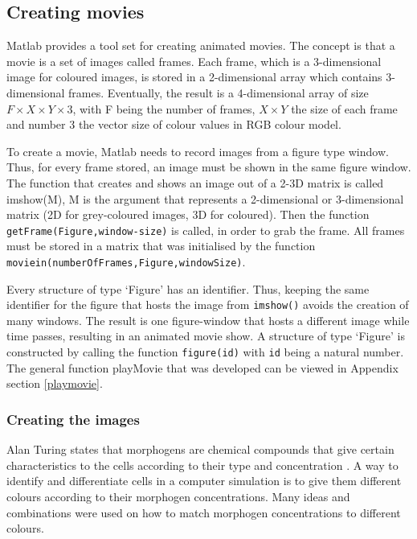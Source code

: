 	\subsection{Creating movies}
    Matlab provides a tool set for creating animated movies. The concept is that a movie is a set of images called frames. Each frame, which is a 3-dimensional image for coloured images, is stored in a 2-dimensional array which contains 3-dimensional frames. Eventually, the result is a 4-dimensional array of size $ F\times X\times Y\times 3 $, with F being the number of frames, $ X\times Y $ the size of each frame and number 3 the vector size of colour values in RGB colour model. 
    
To create a movie, Matlab needs to record images from a figure type window. Thus, for every frame stored, an image must be shown in the same figure window. The function that creates and shows an image out of a 2-3D matrix is called imshow(M), M is the argument that represents a 2-dimensional or 3-dimensional matrix (2D for grey-coloured images, 3D for coloured). Then the function \texttt{getFrame(Figure,window-size)} is called, in order to grab the frame. All frames must be stored in a matrix that was initialised by the function \texttt{moviein(numberOfFrames,Figure,windowSize)}. 
    
Every structure of type `Figure' has an identifier. Thus, keeping the same identifier for the figure that hosts the image from \texttt{imshow()} avoids the creation of many windows. The result is one figure-window that hosts a different image while time passes, resulting in an animated movie show. A structure of type `Figure' is constructed by calling the function \texttt{figure(id)} with \texttt{id} being a natural number. The general function playMovie that was developed can be viewed in Appendix section \ref{playmovie}.

    \subsubsection{Creating the images}
    
Alan Turing states that morphogens are chemical compounds that give certain characteristics to the cells according to their type and concentration \cite{turing_chemical_1990}.
A way to identify and differentiate cells in a computer simulation is to give them different colours according to their morphogen concentrations. Many ideas and combinations were used on how to match morphogen concentrations to different colours. 
    
